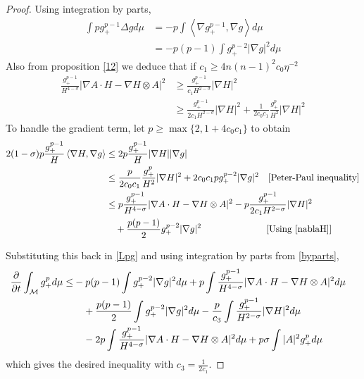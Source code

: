 \begin{proof}
    Using integration by parts, 
    \begin{align}
        \int pg_{+}^{p-1} \Delta g d \mu & = - p\int \left< \nabla g_{+}^{p-1}, \nabla g \right> d \mu \\
        & = -p(p-1) \int g_{+}^{p-2}| \nabla g|^{2} d \mu \label{byparts}
    \end{align}
    Also from proposition \cref{12} we deduce that if $ c_{1} \ge 4 n(n-1)^{2}c_{0} \eta^{-2} $ 
    \begin{align}
        \frac{g_{+}^{p-1}}{H^{4-\sigma}}|\nabla A \cdot H - \nabla H \otimes A|^{2} &\ge \frac{g_{+}^{p-1}}{c_{1}H^{2-\sigma}}| \nabla H|^{2} \nonumber\\
        & \ge \frac{g_{+}^{p-1}}{2c_{1}H^{2-\sigma}}| \nabla H|^{2} + \frac{1}{2c_{0}c_{1}} \frac{g_{+}^{p}}{H^{2}}| \nabla H|^{2} \label{nablaH}
    \end{align}
    To handle the gradient term, let $ p \ge \max \{2,1+4c_{0}c_{1} \} $ to obtain \begin{align*}
        2(1-\sigma)p \frac{g_{+}^{p-1}}{H} \left< \nabla H, \nabla g \right> & \le 2p \frac{g_{+}^{p-1}}{H} |\nabla H| |\nabla g| \\
        & \le \frac{p}{2c_{0}c_{1}} \frac{g_{+}^{p}}{H^{2}}|\nabla H|^{2} + 2c_{0}c_{1}pg_{+}^{p-2}|\nabla g|^{2} \quad [\text{Peter-Paul inequality}] \\
        & \le p \frac{g_{+}^{p-1}}{H^{4-\sigma}}|\nabla A \cdot H - \nabla H \otimes A|^{2} - p \frac{g_{+}^{p-1}}{2c_{1}H^{2-\sigma}}|\nabla H|^{2} \\
        & \quad + \frac{p(p-1)}{2}g_{+}^{p-2}|\nabla g|^{2} \qquad \qquad\quad  \qquad[\text{Using \cref{nablaH}}]
    \end{align*}

    Substituting this back in \cref{Lpg} and using integration by parts from \cref{byparts}, \begin{align*}
        \frac{\partial}{\partial t} \int_{ \mathcal{M}} g_{+}^{p} d \mu \le & -p(p-1)\int g_{+}^{p-2}|\nabla g|^{2} d \mu + p \int \frac{g_{+}^{p-1}}{H^{4-\sigma}}|\nabla A \cdot H - \nabla H \otimes A|^{2}d \mu & \\
        & \quad + \frac{p(p-1)}{2}\int g_{+}^{p-2}|\nabla g|^{2}d \mu - \frac{p}{c_{3}} \int \frac{g_{+}^{p-1}}{H^{2-\sigma}}|\nabla H|^{2} d \mu \\
        & \quad - 2p \int \frac{g_{+}^{p-1}}{H^{4-\sigma}}|\nabla A \cdot H - \nabla H \otimes A|^{2}d \mu + p \sigma \int |A|^{2}g_{+}^{p}d \mu
    \end{align*}
    which gives the desired inequality with $ c_{3} = \frac{1}{2c_{1}} $.
\end{proof}

